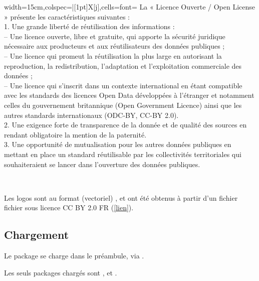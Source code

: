 \documentclass[french,11pt,a4paper]{article}
\begin{document}
\hfill
\begin{tblr}{width=15cm,colspec={|[1pt]X[j]},cells={font=\footnotesize}}
	La « Licence Ouverte / Open License » présente les caractéristiques suivantes :\\
	1. Une grande liberté de réutilisation des informations :\\
	-- Une licence ouverte, libre et gratuite, qui apporte la sécurité juridique nécessaire aux producteurs et aux réutilisateurs des données publiques ;\\
	-- Une licence qui promeut la réutilisation la plus large en autorisant la reproduction, la redistribution, l’adaptation et l’exploitation commerciale des données ;\\
	-- Une licence qui s’inscrit dans un contexte international en étant compatible avec les standards des licences Open Data développées à l’étranger et notamment celles du gouvernement britannique (Open Government Licence) ainsi que les autres standards internationaux (ODC-BY, CC-BY 2.0).\\
	2. Une exigence forte de transparence de la donnée et de qualité des sources en rendant obligatoire la mention de la paternité.\\
	3. Une opportunité de mutualisation pour les autres données publiques en mettant en place un standard réutilisable par les collectivités territoriales qui souhaiteraient se lancer dans l’ouverture des données publiques.\\
\end{tblr}
\hfill~

\medskip

Les logos sont au format (vectoriel) , et ont été obtenus à partir d'un fichier fichier  sous licence CC BY 2.0 FR (\href{https://fr.m.wikipedia.org/wiki/Fichier:Logo-licence-ouverte2.svg}{[lien]}).

\subsection{Chargement}

Le package se charge dans le préambule, via .

Les seuls packages chargés sont ,  et .

\begin{codehigh}[language=latex/latex2,style/main=cyan!10,style/code=cyan!10]
\usepackage{logoetalab}
\end{codehigh}
\end{document}
